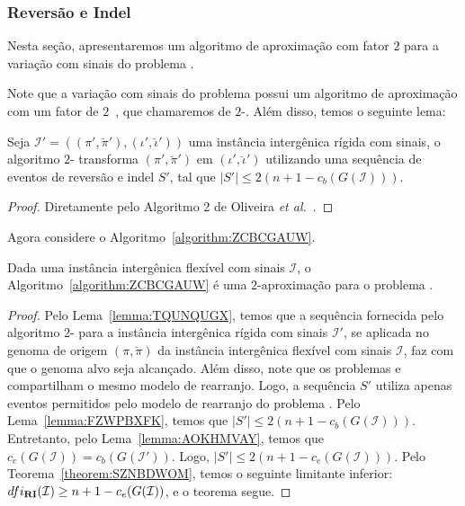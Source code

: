 \subsubsection{Reversão e Indel}

Nesta seção, apresentaremos um algoritmo de aproximação com fator $2$ para a variação com sinais do problema \SbFIRI{}. 

Note que a variação com sinais do problema \SbIRI{} possui um algoritmo de aproximação com um fator de $2$~\cite{2021b-oliveira-etal}, que chamaremos de $2$-\SbIRI{}. Além disso, temos o seguinte lema:

\begin{lemma}\label{lemma:FZWPBXFK}
Seja $\mathcal{I}' = ((\pi',\breve\pi'),(\iota',\breve\iota'))$ uma instância intergênica rígida com sinais, o algoritmo $2$-\SbIRI{} transforma $(\pi',\breve\pi')$ em $(\iota',\breve\iota')$ utilizando uma sequência de eventos de reversão e indel $S'$, tal que $|S'| \le 2({n+1} - c_b(G(\mathcal{I})))$.
\end{lemma}
\begin{proof}
Diretamente pelo Algoritmo 2 de Oliveira \textit{et al.}~\cite{2021b-oliveira-etal}.
\end{proof}

Agora considere o Algoritmo~\ref{algorithm:ZCBCGAUW}.



\begin{theorem}\label{theorem:UEOFTCVZ}
Dada uma instância intergênica flexível com sinais $\mathcal{I}$, o Algoritmo~\ref{algorithm:ZCBCGAUW} é uma $2$-aproximação para o problema \SbFIRI{}.
\end{theorem}
\begin{proof}
Pelo Lema~\ref{lemma:TQUNQUGX}, temos que a sequência fornecida pelo algoritmo $2$-\SbIRI{} para a instância intergênica rígida com sinais $\mathcal{I'}$, se aplicada no genoma de origem $(\pi,\breve\pi)$ da instância intergênica flexível com sinais $\mathcal{I}$, faz com que o genoma alvo seja alcançado. Além disso, note que os problemas \SbIRI{} e \SbFIRI{} compartilham o mesmo modelo de rearranjo. Logo, a sequência $S'$ utiliza apenas eventos permitidos pelo modelo de rearranjo do problema \SbFIRI{}. Pelo Lema~\ref{lemma:FZWPBXFK}, temos que $|S'| \le 2({n+1} - c_b(G(\mathcal{I})))$. Entretanto, pelo Lema~\ref{lemma:AOKHMVAY}, temos que $c_e(G(\mathcal{I})) = c_b(G(\mathcal{I}'))$. Logo, $|S'| \le 2({n+1} - c_e(G(\mathcal{I})))$. Pelo Teorema~\ref{theorem:SZNBDWOM}, temos o seguinte limitante inferior: $dfi_{\textbf{RI}}(\mathcal{I}) \ge {n+1} - c_e(G(\mathcal{I}))$, e o teorema segue.
\end{proof}

